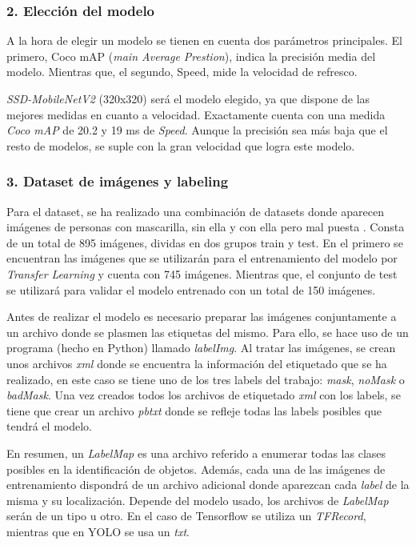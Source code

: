 \vspace{-0.5cm}
\subsubsection*{2. Elección del modelo}
\vspace{-0.7cm}
A la hora de elegir un modelo se tienen en cuenta dos parámetros principales. El primero, Coco mAP (\textit{main Average Prestion}), indica la precisión media del modelo. Mientras que, el segundo, Speed, mide la velocidad de refresco.

\textit{SSD-MobileNetV2} (320x320) será el modelo elegido, ya que dispone de las mejores medidas en cuanto a velocidad. Exactamente cuenta con una medida \textit{Coco mAP} de 20.2 y 19 ms de \textit{Speed}. Aunque la precisión sea más baja que el resto de modelos, se suple con la gran velocidad que logra este modelo.

\vspace{-0.5cm}
\subsubsection*{3. Dataset de imágenes y labeling}
\vspace{-0.7cm}
Para el dataset, se ha realizado una combinación de datasets donde aparecen imágenes de personas con mascarilla, sin ella y con ella pero mal puesta \cite{Cabani_2021} \cite{datasetMask}. Consta de un total de 895 imágenes, dividas en dos grupos train y test. En el primero se encuentran las imágenes que se utilizarán para el entrenamiento del modelo por \textit{Transfer Learning} y cuenta con 745 imágenes. Mientras que, el conjunto de test se utilizará para validar el modelo entrenado con un total de 150 imágenes.

Antes de realizar el modelo es necesario preparar las imágenes conjuntamente a un archivo donde se plasmen las etiquetas del mismo. Para ello, se hace uso de un programa (hecho en Python) llamado \textit{labelImg}. Al tratar las imágenes, se crean unos archivos \textit{xml} donde se encuentra la información del etiquetado que se ha realizado, en este caso se tiene uno de los tres labels del trabajo: \textit{mask}, \textit{noMask} o \textit{badMask}. Una vez creados todos los archivos de etiquetado \textit{xml} con los labels, se tiene que crear un archivo \textit{pbtxt} donde se refleje todas las labels posibles que tendrá el modelo.

En resumen, un \textit{LabelMap} es una archivo referido a enumerar todas las clases posibles en la identificación de objetos. Además, cada una de las imágenes de entrenamiento dispondrá de un archivo adicional donde aparezcan cada \textit{label} de la misma y su localización. Depende del modelo usado, los archivos de \textit{LabelMap} serán de un tipo u otro. En el caso de Tensorflow se utiliza un \textit{TFRecord}, mientras que en YOLO se usa un \textit{txt}.

